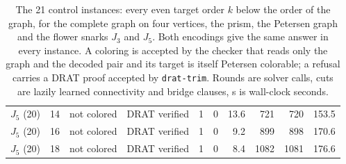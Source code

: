 \documentclass[11pt]{article}
\theoremstyle{definition}
\theoremstyle{remark}
\begin{document}
\begin{table}[tbp]
\begin{tabular}{llllrrrrrr}
$J_5$ (20) & 14 & not colored & DRAT verified & 1 & 0 & 13.6 & 721 & 720 & 153.5 \\
$J_5$ (20) & 16 & not colored & DRAT verified & 1 & 0 & 9.2 & 899 & 898 & 170.6 \\
$J_5$ (20) & 18 & not colored & DRAT verified & 1 & 0 & 8.4 & 1082 & 1081 & 176.6 \\
\bottomrule
\end{tabular}
\caption{The 21 control instances: every even target order $k$ below the order of the graph, for the complete graph on four vertices, the prism, the Petersen graph and the flower snarks $J_3$ and $J_5$. Both encodings give the same answer in every instance. A coloring is accepted by the checker that reads only the graph and the decoded pair and its target is itself Petersen colorable; a refusal carries a DRAT proof accepted by \texttt{drat-trim}. Rounds are solver calls, cuts are lazily learned connectivity and bridge clauses, s is wall-clock seconds.}\label{tab:controls}
\end{table}
\end{document}
